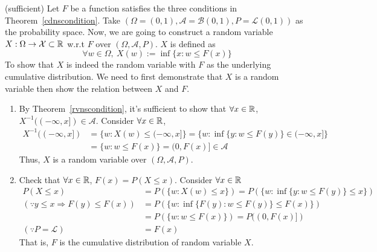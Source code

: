 \documentclass[Probability_Theory.tex]{subfiles}
\begin{document}
(sufficient) Let $F$ be a function satisfies the three conditions in Theorem~\ref{cdnscondition}. Take $(\Omega=(0,1),\mathcal{A}=\mathcal{B}(0,1),P = \mathcal{L}(0,1))$ as the probability space. Now, we are going to construct a random variable $X:\Omega\rightarrow\mathcal{X}\subset{\mathbb R}$ w.r.t $F$ over $(\Omega,\mathcal{A},P)$. $X$ is defined as
$$\forall w\in\Omega,\ X(w):=\inf\{x:w\leq F(x) \}$$
To show that $X$ is indeed the random variable with $F$ as the underlying cumulative distribution. We need to first demonstrate that $X$ is a random variable then show the relation between $X$ and $F$.
\begin{enumerate}
	\item By Theorem~\ref{rvnscondition}, it's sufficient to show that $\forall x\in{\mathbb R}$, $X^{-1}((-\infty,x])\in\mathcal{A}$. Consider $\forall x\in{\mathbb R}$,
	\begin{align*}
	X^{-1}((-\infty,x]) &= \{w:X(w)\leq(-\infty,x] \} = \{w:\inf\{y:w\leq F(y)\}\in(-\infty,x]  \}\\
	&=\{w:w\leq F(x) \} = (0,F(x)]\in\mathcal{A}
	\end{align*}
	Thus, $X$ is a random variable over $(\Omega,\mathcal{A},P)$.
	\item Check that $\forall x\in{\mathbb R}$, $F(x) = P(X\leq x)$. Consider $\forall x\in{\mathbb R}$
	\begin{align*}
	P(X\leq x) &= P(\{w:X(w)\leq x \}) = P(\{w:\inf\{y:w\leq F(y)\}\leq x \})\\
	(\because y\leq x\Rightarrow F(y)\leq F(x))&=P(\{w:\inf\{F(y):w\leq F(y)\}\leq F(x) \})\\
	&=P(\{w:w\leq F(x) \}) = P((0,F(x)])\\
	(\because P=\mathcal{L})&=F(x)
	\end{align*}
	That is, $F$ is the cumulative distribution of random variable $X$.
\end{enumerate}
\end{document}
